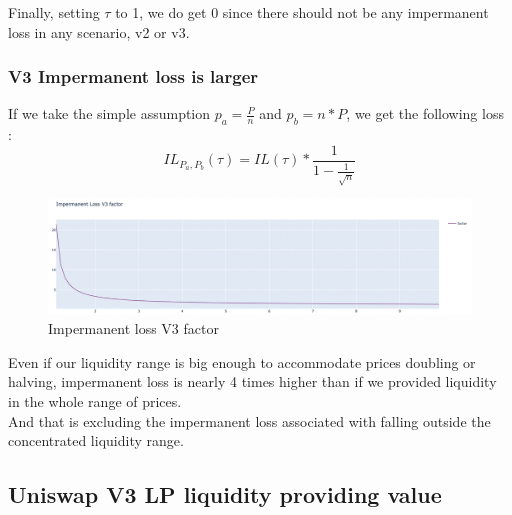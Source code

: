 \documentclass[conference]{IEEEtran}
\begin{document}
Finally, setting $\tau$ to 1, we do get 0 since there should not be any impermanent loss in any scenario, v2 or v3.\\
\subsubsection{V3 Impermanent loss is larger}\label{v3isbad}
If we take the simple assumption $p_a = \frac{P}{n}$ and $p_b = n*P$, we get the following loss :
\begin{equation}\label{nasty_il}
IL_{P_a,P_b}(\tau) = IL(\tau) * \frac{1}{1-\frac{1}{\sqrt{n}}}
\end{equation}
\begin{figure}[h!]
    \centering
    \includegraphics[scale=0.15]{Plots/factor.png}
    \caption{Impermanent loss V3 factor}
    \label{fig:rangy_market}
\end{figure}

Even if our liquidity range is big enough to accommodate prices doubling or halving, impermanent loss is nearly 4 times higher than if we provided liquidity in the whole range of prices.\\
And that is excluding the impermanent loss associated with falling outside the concentrated liquidity range.\\
\subsection{Uniswap V3 LP liquidity providing value}
\end{document}
